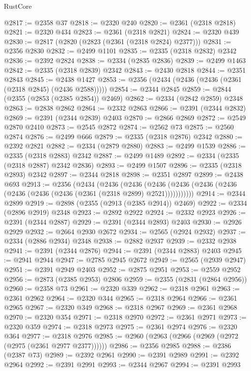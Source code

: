 \begin{lexlean}{RustCore}
\begin{coremodule}
@2817 := @2358 @37
@2818 := @2320 @240
@2820 := @2361 (@2318 @2818)
@2821 := @2320 @434
@2823 := @2361 (@2318 @2821)
@2824 := @2320 @439
@2830 := @2817 (@2820 (@2823 (@2361 (@2318 @2824) @2377)))
@2831 := @2356 @2830
@2832 := @2499 @1101
@2835 := @2335 (@2318 @2832) @2342
@2836 := @2392 @2824
@2838 := @2334 (@2835 @2836)
@2839 := @2499 @1463
@2842 := @2335 (@2318 @2839) @2342
@2843 := @2430 @2818
@2844 := @2351 @2843
@2845 := @2438 @1427
@2853 := @2356 (@2434 (@2436 (@2436 (@2361 (@2318 @2845) (@2436 @2588)))))
@2854 := @2344 @2845
@2859 := @2844 (@2355 (@2853 (@2385 @2854)) @2469)
@2862 := @2334 (@2842 @2859) @2348
@2863 := @2838 @2862
@2864 := @2332 @2863
@2866 := @2391 (@2344 @2832)
@2869 := @2391 (@2344 @2839) @2403
@2870 := @2866 @2869
@2872 := @2549 @2870 @2410
@2873 := @2545 @2872
@2874 := @2562 @73
@2875 := @2560 @2874
@2876 := @2499 @666
@2879 := @2335 (@2318 @2876) @2342
@2880 := @2392 @2821
@2882 := @2334 (@2879 @2880)
@2883 := @2499 @1539
@2886 := @2335 (@2318 @2883) @2342
@2887 := @2499 @1489
@2892 := @2334 (@2335 (@2318 @2887) @2342 @2836)
@2893 := @2499 @1507
@2896 := @2335 (@2318 @2893) @2342
@2897 := @2344 @2818
@2898 := @2351 @2897
@2899 := @2438 @693
@2913 := @2356
    (@2434
      (@2436
        (@2436
          (@2436 (@2436 (@2436 (@2436 (@2436 (@2436 (@2436 (@2361 (@2318 @2899) @2521)))))))))))
@2914 := @2344 @2899
@2919 := @2898 (@2355 (@2913 (@2385 @2914)) @2469)
@2922 := @2334 (@2896 @2919) @2348
@2923 := @2892 @2922
@2924 := @2332 @2923
@2926 := @2391 (@2344 @2887)
@2929 := @2391 (@2344 @2893) @2403
@2930 := @2926 @2929
@2932 := @2664 @2930 @2672
@2934 := @2565 (@2924 @2932)
@2937 := @2334 (@2886 @2934) @2348
@2938 := @2882 @2937
@2939 := @2332 @2938
@2941 := @2391 (@2344 @2876)
@2944 := @2391 (@2344 @2883) @2403
@2945 := @2941 @2944
@2947 := @2785 @2945 @2672
@2949 := @2565 (@2939 @2947)
@2951 := @2391 @2949 @2403
@2952 := @2875 @2951
@2953 := @2559 @2952
@2956 := @2873 (@2385 @2953) @2806
@2959 := @2355 (@2831 (@2864 @2956))
@2960 := @2358 @73
@2961 := @2320 @339
@2962 := @2318 @2961
@2963 := @2361 @2962
@2964 := @2320 @344
@2965 := @2318 @2964
@2966 := @2361 @2965
@2967 := @2320 @349
@2968 := @2318 @2967
@2969 := @2361 @2968
@2970 := @2320 @354
@2971 := @2318 @2970
@2972 := @2361 @2971
@2973 := @2320 @359
@2974 := @2318 @2973
@2975 := @2361 @2974
@2976 := @2320 @364
@2977 := @2318 @2976
@2985 := @2960 (@2963 (@2966 (@2969 (@2972 (@2975 (@2361 @2977 @2377))))))
@2986 := @2356 @2985
@2988 := @2386 (@2387 @73)
@2989 := @2392 @2961
@2990 := @2391 @2989
@2991 := @2392 @2964
@2992 := @2391 @2991
@2993 := @2344 @2967
@2994 := @2391 @2993

\end{coremodule}
\end{lexlean}
